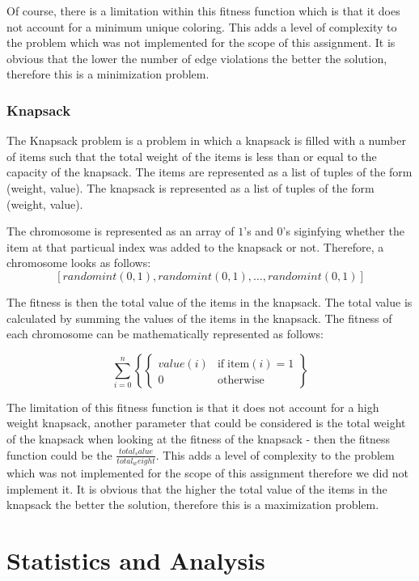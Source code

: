 \documentclass[11pt, letterpaper]{article}
\begin{document}
Of course, there is a limitation within this fitness function which is that it does not account for a minimum unique coloring. This adds a level of complexity to the problem which was not implemented for the scope of this assignment. It is obvious that the lower the number of edge violations the better the solution, therefore this is a minimization problem.
\subsubsection{Knapsack}
The Knapsack problem is a problem in which a knapsack is filled with a number of items such that the total weight of the items is less than or equal to the capacity of the knapsack. The items are represented as a list of tuples of the form (weight, value). The knapsack is represented as a list of tuples of the form (weight, value). 

The chromosome is represented as an array of $1$'s and $0$'s siginfying whether the item at that particual index was added to the knapsack or not. Therefore, a chromosome looks as follows:
$$[randomint(0,1), randomint(0,1), \dots, randomint(0,1)]$$

The fitness is then the total value of the items in the knapsack. The total value is calculated by summing the values of the items in the knapsack. The fitness of each chromosome can be mathematically represented as follows:

$$\sum_{i=0}^{n} \left\{ \left\{ \begin{array}{ll} value(i) & \text{if} \; \text{item}(i) = 1 \\ 0 & \text{otherwise} \end{array} \right. \right\}$$

The limitation of this fitness function is that it does not account for a high weight knapsack, another parameter that could be considered is the total weight of the knapsack when looking at the fitness of the knapsack - then the fitness function could be the $\frac{total_value}{total_weight}$. This adds a level of complexity to the problem which was not implemented for the scope of this assignment therefore we did not implement it. It is obvious that the higher the total value of the items in the knapsack the better the solution, therefore this is a maximization problem.
\section{Statistics and Analysis}
\end{document}
